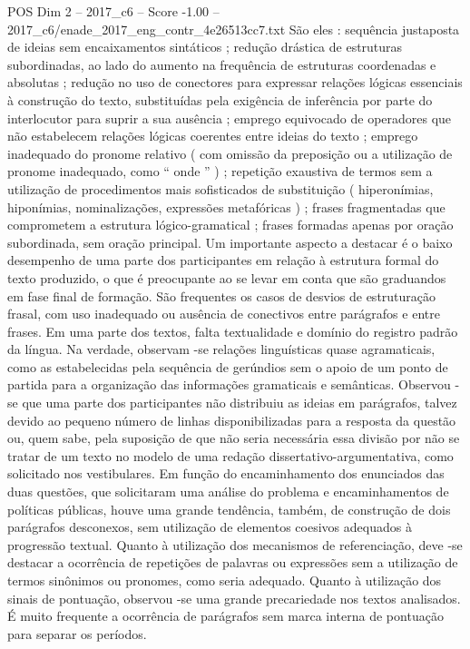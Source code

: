 \begin{textsample}{POS Dim 2 – 2017\_c6 – Score -1.00 – 2017\_c6/enade\_2017\_eng\_contr\_4e26513cc7.txt}
São eles : sequência justaposta de ideias sem encaixamentos sintáticos ; redução drástica de estruturas subordinadas, ao lado do aumento na frequência de estruturas coordenadas e absolutas ; redução no uso de conectores para expressar relações lógicas essenciais à construção do texto, substituídas pela exigência de inferência por parte do interlocutor para suprir a sua ausência ; emprego equivocado de operadores que não estabelecem relações lógicas coerentes entre ideias do texto ; emprego inadequado do pronome relativo ( com omissão da preposição ou a utilização de pronome inadequado, como “ onde ” ) ; repetição exaustiva de termos sem a utilização de procedimentos mais sofisticados de substituição ( hiperonímias, hiponímias, nominalizações, expressões metafóricas ) ; frases fragmentadas que comprometem a estrutura lógico-gramatical ; frases formadas apenas por oração subordinada, sem oração principal.
Um importante aspecto a destacar é o baixo desempenho de uma parte dos participantes em relação à estrutura formal do texto produzido, o que é preocupante ao se levar em conta que são graduandos em fase final de formação.
São frequentes os casos de desvios de estruturação frasal, com uso inadequado ou ausência de conectivos entre parágrafos e entre frases.
Em uma parte dos textos, falta textualidade e domínio do registro padrão da língua.
Na verdade, observam -se relações linguísticas quase agramaticais, como as estabelecidas pela sequência de gerúndios sem o apoio de um ponto de partida para a organização das informações gramaticais e semânticas.
Observou -se que uma parte dos participantes não distribuiu as ideias em parágrafos, talvez devido ao pequeno número de linhas disponibilizadas para a resposta da questão ou, quem sabe, pela suposição de que não seria necessária essa divisão por não se tratar de um texto no modelo de uma redação dissertativo-argumentativa, como solicitado nos vestibulares.
Em função do encaminhamento dos enunciados das duas questões, que solicitaram uma análise do problema e encaminhamentos de políticas públicas, houve uma grande tendência, também, de construção de dois parágrafos desconexos, sem utilização de elementos coesivos adequados à progressão textual.
Quanto à utilização dos mecanismos de referenciação, deve -se destacar a ocorrência de repetições de palavras ou expressões sem a utilização de termos sinônimos ou pronomes, como seria adequado.
Quanto à utilização dos sinais de pontuação, observou -se uma grande precariedade nos textos analisados.
É muito frequente a ocorrência de parágrafos sem marca interna de pontuação para separar os períodos.

\end{textsample}
